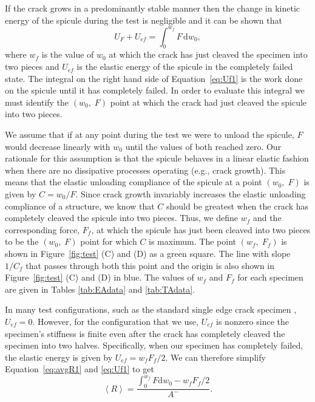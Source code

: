 \documentclass[12pt,onecolumn]{article}
\begin{document}
\begin{bibunit}
If the crack grows in a predominantly stable manner then the change in kinetic energy of the spicule during the test is negligible and it can be shown that
%
\begin{equation}
\label{eq:Uf1}
U_F+U_{ef}=\int_0^{w_f}F \,\mathrm{d}w_0,
\end{equation}
%
where $w_f$ is the value of $w_0$ at which the crack has just cleaved the specimen into two pieces and $U_{ef}$ is the elastic energy of the spicule in the completely failed state. The integral on the right hand side of Equation~\eqref{eq:Uf1} is the work done on the spicule until it has completely failed. In order to evaluate this integral we must identify the $(w_0,\; F)$ point at which the crack had just cleaved the spicule into two pieces. 

We assume that if at any point during the test we were to unload the spicule, $F$ would decrease linearly with $w_0$ until the values of both reached zero. Our rationale for this assumption is that the spicule behaves in a linear elastic fashion when there are no dissipative processes operating (e.g., crack growth). This means that the elastic unloading compliance of the spicule at a point $(w_0, \;F)$ is given by $C=w_0/F$. Since crack growth invariably increases the elastic unloading compliance of a structure, we know that $C$ should be greatest when the crack has completely cleaved the spicule into two pieces. Thus, we define $w_f$ and the corresponding force, $F_f$, at which the spicule has just been cleaved into two pieces to be the $(w_0, \;F)$ point for which $C$ is maximum. The point $(w_f,\; F_f)$ is shown in Figure~\ref{fig:test} (C) and (D) as a green square. The line with slope $1/C_f$ that passes through both this point and the origin is also shown in Figure~\ref{fig:test} (C) and (D) in blue. The values of $w_f$ and $F_f$ for each specimen are given in Tables \ref{tab:EAdata} and \ref{tab:TAdata}.

In many test configurations, such as the standard single edge crack specimen \cite{bush1976experimentally}, $U_{ef}=0$. However, for the configuration that we use, $U_{ef}$ is nonzero since the specimen's stiffness is finite even after the crack has completely cleaved the specimen into two halves. Specifically, when our specimen has completely failed, the elastic energy is given by $U_{ef}=w_f F_{f}/2$. We can therefore simplify Equation~\eqref{eq:avgR1} and \eqref{eq:Uf1} to get
%
\begin{equation}
\label{eq:avgR2}
\left< R \right>=\frac{\int_0^{w_f}F \mathrm{d}w_0-w_f F_{f}/2}{A^-}.
\end{equation}


\end{bibunit}
\end{document}
